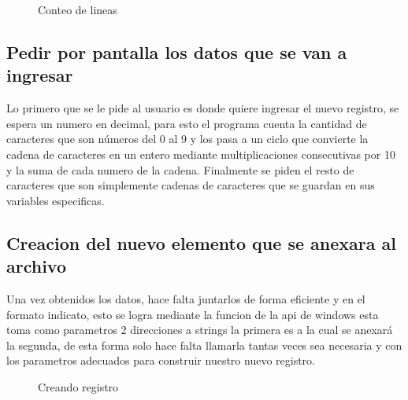 \begin{figure}[!ht]
\centering
{}
\caption{Conteo de lineas}
\end{figure}

\subsection*{Pedir por pantalla los datos que se van a ingresar}
Lo primero que se le pide al usuario es donde quiere ingresar el nuevo registro,
se espera un numero en decimal, para esto el programa cuenta la cantidad de
caracteres que son números del 0 al 9 y los pasa a un ciclo que convierte la
cadena de caracteres en un entero mediante multiplicaciones consecutivas por
10 y la suma de cada numero de la cadena. Finalmente se piden el resto de
caracteres que son simplemente cadenas de caracteres que se guardan en sus
variables especificas.


\subsection*{ Creacion del nuevo elemento que se anexara al archivo}
    Una vez obtenidos los datos, hace falta juntarlos de forma eficiente y en el
    formato indicato, esto se logra mediante la funcion de la api de windows
     esta toma como parametros 2 direcciones a strings
    la primera es a la cual se anexará la segunda, de esta forma solo hace falta
    llamarla tantas veces sea necesaria y con los parametros adecuados para
    construir nuestro nuevo registro.


\begin{figure}[!ht]
\centering
{}
\caption{Creando registro}
\end{figure}


